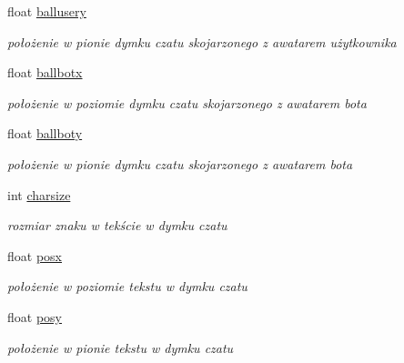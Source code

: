 \begin{DoxyCompactItemize}
\mbox{\label{struct_avatar_initializer_acc3a2be00e0435ffe47afa70b036424a}} 
float \mbox{\hyperlink{struct_avatar_initializer_acc3a2be00e0435ffe47afa70b036424a}{ballusery}}
\begin{DoxyCompactList}\small\item\em położenie w pionie dymku czatu skojarzonego z awatarem użytkownika \end{DoxyCompactList}\item 
\mbox{\label{struct_avatar_initializer_ab8ea9f15c7c10473742106a7e2208adb}} 
float \mbox{\hyperlink{struct_avatar_initializer_ab8ea9f15c7c10473742106a7e2208adb}{ballbotx}}
\begin{DoxyCompactList}\small\item\em położenie w poziomie dymku czatu skojarzonego z awatarem bota \end{DoxyCompactList}\item 
\mbox{\label{struct_avatar_initializer_abbfa6c8a66b97cf64250e22436800b21}} 
float \mbox{\hyperlink{struct_avatar_initializer_abbfa6c8a66b97cf64250e22436800b21}{ballboty}}
\begin{DoxyCompactList}\small\item\em położenie w pionie dymku czatu skojarzonego z awatarem bota \end{DoxyCompactList}\item 
\mbox{\label{struct_avatar_initializer_ad72b6f923bbbb0bfa93b7bea5402c737}} 
int \mbox{\hyperlink{struct_avatar_initializer_ad72b6f923bbbb0bfa93b7bea5402c737}{charsize}}
\begin{DoxyCompactList}\small\item\em rozmiar znaku w tekście w dymku czatu \end{DoxyCompactList}\item 
\mbox{\label{struct_avatar_initializer_a7ab2f5f8779119634f40cf4dc3dc0a06}} 
float \mbox{\hyperlink{struct_avatar_initializer_a7ab2f5f8779119634f40cf4dc3dc0a06}{posx}}
\begin{DoxyCompactList}\small\item\em położenie w poziomie tekstu w dymku czatu \end{DoxyCompactList}\item 
\mbox{\label{struct_avatar_initializer_a51a4edf8423b40577935fa441cd90207}} 
float \mbox{\hyperlink{struct_avatar_initializer_a51a4edf8423b40577935fa441cd90207}{posy}}
\begin{DoxyCompactList}\small\item\em położenie w pionie tekstu w dymku czatu \end{DoxyCompactList}\end{DoxyCompactItemize}


